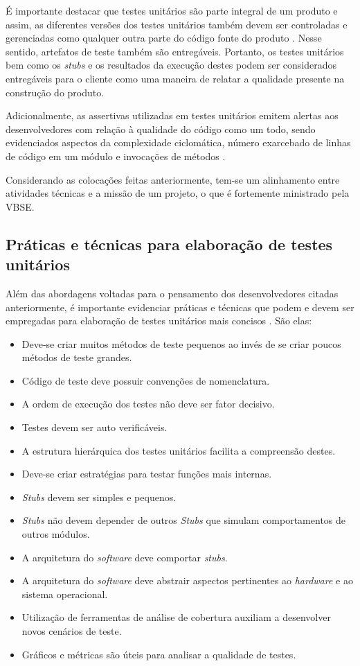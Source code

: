 É importante destacar que testes unitários são parte integral de um produto e assim, as diferentes versões dos testes unitários também devem ser controladas e gerenciadas como qualquer outra parte do código fonte do produto \cite{nasa}. Nesse sentido, artefatos de teste também são entregáveis. Portanto, os testes unitários bem como os \textit{stubs} e os resultados da execução destes podem ser considerados entregáveis para o cliente como uma maneira de relatar a qualidade presente na construção do produto.

Adicionalmente, as assertivas utilizadas em testes unitários emitem alertas aos desenvolvedores com relação à qualidade do código como um todo, sendo evidenciados aspectos da complexidade ciclomática, número exarcebado de linhas de código em um módulo e invocações de métodos \cite{asserts}.

Considerando as colocações feitas anteriormente, tem-se um alinhamento entre atividades técnicas e a missão de um projeto, o que é fortemente ministrado pela VBSE.

\subsection{Práticas e técnicas para elaboração de testes unitários}

Além das abordagens voltadas para o pensamento dos desenvolvedores citadas anteriormente, é importante evidenciar práticas e técnicas que podem e devem ser empregadas para elaboração de testes unitários mais concisos \cite{nasa}. São elas:

\begin{itemize}
	\item Deve-se criar muitos métodos de teste pequenos ao invés de se criar poucos métodos de teste grandes.
	\item Código de teste deve possuir convenções de nomenclatura.
	\item A ordem de execução dos testes não deve ser fator decisivo.
	\item Testes devem ser auto verificáveis.
	\item A estrutura hierárquica dos testes unitários facilita a compreensão destes.
	\item Deve-se criar estratégias para testar funções mais internas.
	\item \textit{Stubs} devem ser simples e pequenos.
	\item \textit{Stubs} não devem depender de outros \textit{Stubs} que simulam comportamentos de outros módulos.
	\item A arquitetura do \textit{software} deve comportar \textit{stubs}.
	\item A arquitetura do \textit{software} deve abstrair aspectos pertinentes ao \textit{hardware} e ao sistema operacional.
	\item Utilização de ferramentas de análise de cobertura auxiliam a desenvolver novos cenários de teste.
	\item Gráficos e métricas são úteis para analisar a qualidade de testes.
\end{itemize}

